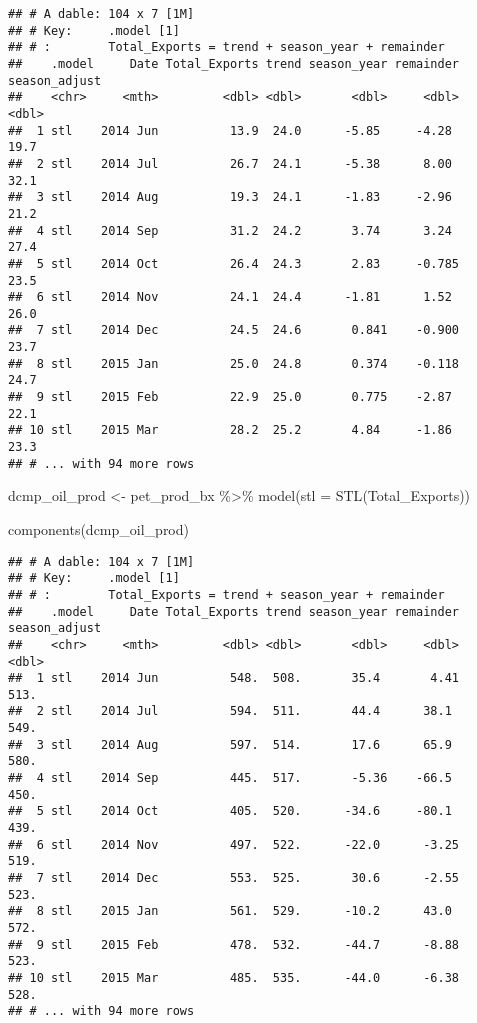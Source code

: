 \documentclass[
]{article}
\newenvironment{Shaded}{\begin{snugshade}}{\end{snugshade}}
\newcommand{\AttributeTok}[1]{\textcolor[rgb]{0.77,0.63,0.00}{#1}}
\newcommand{\FunctionTok}[1]{\textcolor[rgb]{0.00,0.00,0.00}{#1}}
\newcommand{\NormalTok}[1]{#1}
\newcommand{\OtherTok}[1]{\textcolor[rgb]{0.56,0.35,0.01}{#1}}
\newcommand{\SpecialCharTok}[1]{\textcolor[rgb]{0.00,0.00,0.00}{#1}}
\begin{document}
\begin{verbatim}
## # A dable: 104 x 7 [1M]
## # Key:     .model [1]
## # :        Total_Exports = trend + season_year + remainder
##    .model     Date Total_Exports trend season_year remainder season_adjust
##    <chr>     <mth>         <dbl> <dbl>       <dbl>     <dbl>         <dbl>
##  1 stl    2014 Jun          13.9  24.0      -5.85     -4.28           19.7
##  2 stl    2014 Jul          26.7  24.1      -5.38      8.00           32.1
##  3 stl    2014 Aug          19.3  24.1      -1.83     -2.96           21.2
##  4 stl    2014 Sep          31.2  24.2       3.74      3.24           27.4
##  5 stl    2014 Oct          26.4  24.3       2.83     -0.785          23.5
##  6 stl    2014 Nov          24.1  24.4      -1.81      1.52           26.0
##  7 stl    2014 Dec          24.5  24.6       0.841    -0.900          23.7
##  8 stl    2015 Jan          25.0  24.8       0.374    -0.118          24.7
##  9 stl    2015 Feb          22.9  25.0       0.775    -2.87           22.1
## 10 stl    2015 Mar          28.2  25.2       4.84     -1.86           23.3
## # ... with 94 more rows
\end{verbatim}

\begin{Shaded}
\begin{Highlighting}[]
\NormalTok{dcmp\_oil\_prod }\OtherTok{\textless{}{-}}\NormalTok{ pet\_prod\_bx }\SpecialCharTok{\%\textgreater{}\%}
  \FunctionTok{model}\NormalTok{(}\AttributeTok{stl =} \FunctionTok{STL}\NormalTok{(Total\_Exports))}

\FunctionTok{components}\NormalTok{(dcmp\_oil\_prod)}
\end{Highlighting}
\end{Shaded}

\begin{verbatim}
## # A dable: 104 x 7 [1M]
## # Key:     .model [1]
## # :        Total_Exports = trend + season_year + remainder
##    .model     Date Total_Exports trend season_year remainder season_adjust
##    <chr>     <mth>         <dbl> <dbl>       <dbl>     <dbl>         <dbl>
##  1 stl    2014 Jun          548.  508.       35.4       4.41          513.
##  2 stl    2014 Jul          594.  511.       44.4      38.1           549.
##  3 stl    2014 Aug          597.  514.       17.6      65.9           580.
##  4 stl    2014 Sep          445.  517.       -5.36    -66.5           450.
##  5 stl    2014 Oct          405.  520.      -34.6     -80.1           439.
##  6 stl    2014 Nov          497.  522.      -22.0      -3.25          519.
##  7 stl    2014 Dec          553.  525.       30.6      -2.55          523.
##  8 stl    2015 Jan          561.  529.      -10.2      43.0           572.
##  9 stl    2015 Feb          478.  532.      -44.7      -8.88          523.
## 10 stl    2015 Mar          485.  535.      -44.0      -6.38          528.
## # ... with 94 more rows
\end{verbatim}
\end{document}
